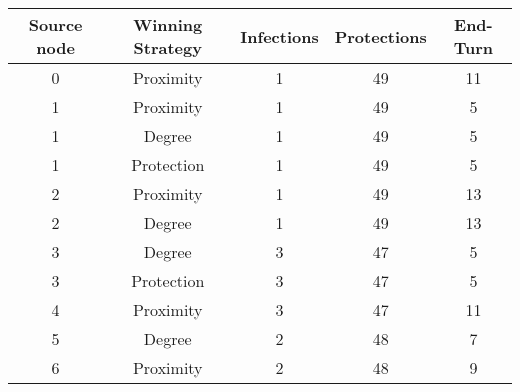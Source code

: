 \documentclass[results.tex]{subfiles}
\begin{document}
    \begin{center}
        \begin{tabular}{| c || c | c | c | c |}
            \hline
            {\bfseries Source node} & {\bfseries Winning Strategy} & {\bfseries Infections} & {\bfseries Protections}
            & {\bfseries End-Turn}
            \\  %
            \hline\hline
            0                       & Proximity                    & 1                      & 49                      & 11                   \\
            \hline
            1                       & Proximity                    & 1                      & 49                      & 5                    \\
            \hline
            1                       & Degree                       & 1                      & 49                      & 5                    \\
            \hline
            1                       & Protection                   & 1                      & 49                      & 5                    \\
            \hline
            2                       & Proximity                    & 1                      & 49                      & 13                   \\
            \hline
            2                       & Degree                       & 1                      & 49                      & 13                   \\
            \hline
            3                       & Degree                       & 3                      & 47                      & 5                    \\
            \hline
            3                       & Protection                   & 3                      & 47                      & 5                    \\
            \hline
            4                       & Proximity                    & 3                      & 47                      & 11                   \\
            \hline
            5                       & Degree                       & 2                      & 48                      & 7                    \\
            \hline
            6                       & Proximity                    & 2                      & 48                      & 9                    \\

\end{tabular}
\end{center}
\end{document}
